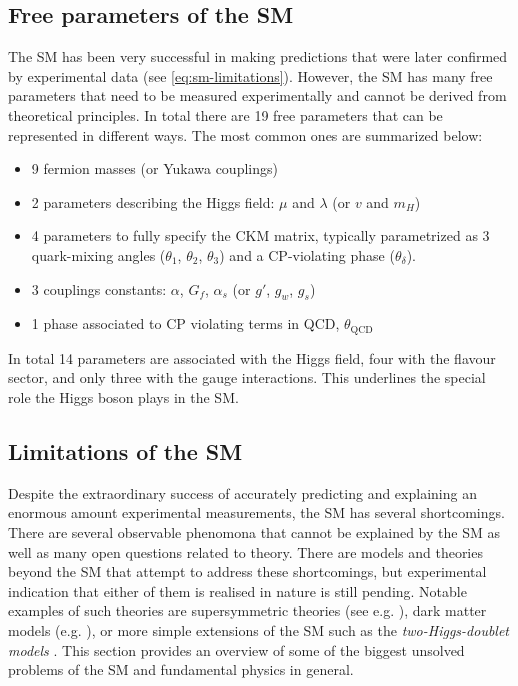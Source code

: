 \subsection{Free parameters of the SM}
\label{subsec:free-pars-sm}
The SM has been very successful in making predictions that were later confirmed by experimental data (see \cref{eq:sm-limitations}). However, the SM has many free parameters that need to be measured experimentally and cannot be derived from theoretical principles.  
In total there are 19 free parameters that can be represented in different ways. The most common ones are summarized below:
\begin{itemize}
  \item 9 fermion masses (or Yukawa couplings)
  \item 2 parameters describing the Higgs field: $\mu$ and $\lambda$ (or $v$ and $m_H$)
  \item 4 parameters to fully specify the CKM matrix, typically parametrized as 3 quark-mixing angles ($\theta_1$, $\theta_2$, $\theta_3$) and a CP-violating phase ($\theta_\delta$).
  \item 3 couplings constants: $\alpha$, $G_f$, $\alpha_s$ (or $g'$, $g_w$, $g_s$)
  \item 1 phase associated to CP violating terms in QCD, $\theta_{\text{QCD}}$
\end{itemize}
In total 14 parameters are associated with the Higgs field, four with the flavour sector, and only three with the gauge interactions. This underlines the special role the Higgs boson plays in the SM.

\subsection{Limitations of the SM}
\label{subsec:limitations}
Despite the extraordinary success of accurately predicting and explaining an enormous amount experimental measurements, the SM has several shortcomings.
There are several observable phenomona that cannot be explained by the SM as well as many open questions related to theory. 
There are models and theories beyond the SM that attempt to address these shortcomings, but experimental indication that either of them is realised in nature is still pending.
Notable examples of such theories are supersymmetric theories (see e.g. ), dark matter models (e.g. ), or more simple extensions of the SM such as the \emph{two-Higgs-doublet models} \cite{Branco_2012}.
This section provides an overview of some of the biggest unsolved problems of the SM and fundamental physics in general.

